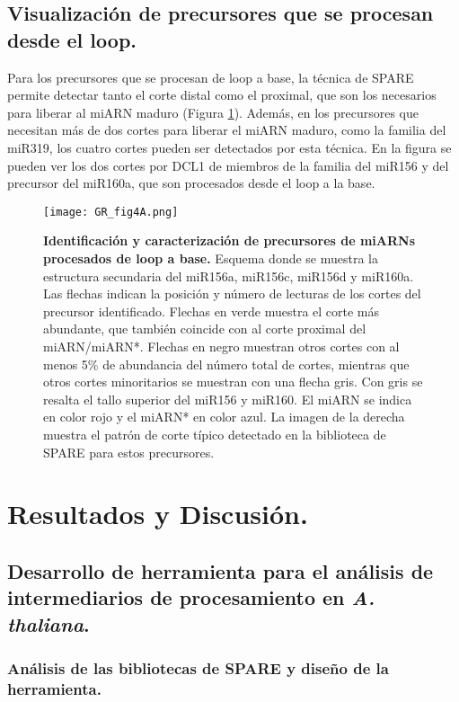 \subsection{Visualización de precursores que se procesan desde el loop.}

Para los precursores que se procesan de loop a base, la técnica de SPARE permite detectar tanto el corte distal como el proximal, que son los necesarios para liberar al miARN maduro (Figura \ref{fig:GR_fig4A}).
Además, en los precursores que necesitan más de dos cortes para liberar el miARN maduro, como la familia del miR319, los cuatro cortes pueden ser detectados por esta técnica.
En la figura se pueden ver los dos cortes por DCL1 de miembros de la familia del miR156 y del precursor del miR160a, que son procesados desde el loop a la base.

\begin{figure}[htbp!] 
    \centering    
    \texttt{[image: GR\_fig4A.png]}
    \caption[Identificación y caracterización de precursores de miARNs procesados de loop a base]{
    \textbf{Identificación y caracterización de precursores de miARNs procesados de loop a base.}
    Esquema donde se muestra la estructura secundaria del miR156a, miR156c, miR156d y miR160a.
    Las flechas indican la posición y número de lecturas de los cortes del precursor identificado.
    Flechas en verde muestra el corte más abundante, que también coincide con al corte proximal del miARN/miARN*.
    Flechas en negro muestran otros cortes con al menos 5\% de abundancia del número total de cortes, mientras que otros cortes minoritarios se muestran con una flecha gris.
    Con gris se resalta el tallo superior del miR156 y miR160. El miARN se indica en color rojo y el miARN* en color azul.
    La imagen de la derecha muestra el patrón de corte típico detectado en la biblioteca de SPARE para estos precursores.
}
    \label{fig:GR_fig4A}
\end{figure}


\section{Resultados y Discusión.}

\subsection{Desarrollo de herramienta para el análisis de intermediarios de procesamiento en \textit{A. thaliana}.}

\subsubsection{Análisis de las bibliotecas de SPARE y diseño de la herramienta.}

